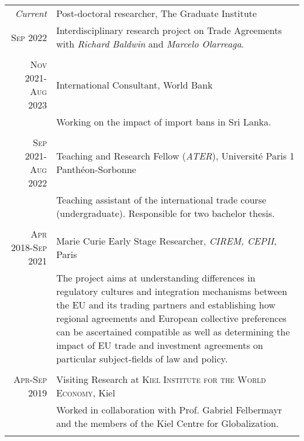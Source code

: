 \documentclass[a4paper,10pt]{article} %
\begin{document}
\begin{tabular}{r|p{11cm}}


\emph{Current} & Post-doctoral researcher, The Graduate Institute \\
\textsc{Sep 2022} & \footnotesize{Interdisciplinary research project on Trade Agreements with \textit{Richard Baldwin} and \textit{Marcelo Olarreaga}.}\\
\multicolumn{2}{c}{} \\


\textsc{Nov 2021-Aug 2023} & International Consultant, World Bank \\
 & \footnotesize{Working on the impact of import bans in Sri Lanka.}\\
\multicolumn{2}{c}{} \\


\textsc{Sep 2021-Aug 2022} & Teaching and Research Fellow (\textit{ATER}), Université Paris 1 Panthéon-Sorbonne \\
& \footnotesize{Teaching assistant of the international trade course (undergraduate). Responsible for two bachelor thesis.}\\
\multicolumn{2}{c}{} \\


\textsc{Apr 2018-Sep 2021} & Marie Curie Early Stage Researcher, \emph{CIREM, CEPII}, Paris \\
& \footnotesize{The project aims at understanding differences in regulatory cultures and integration mechanisms between the EU and its trading partners and establishing how regional agreements and European collective preferences can be ascertained compatible as well as determining the impact of EU trade and investment agreements on particular subject-fields of law and policy.}\\
\multicolumn{2}{c}{} \\


\textsc{Apr-Sep 2019} & Visiting Research at \textsc{Kiel Institute for the World Economy}, Kiel \emph{}\\
& \footnotesize{Worked in collaboration with Prof. Gabriel Felbermayr and the members of the Kiel Centre for Globalization.}\\
\multicolumn{2}{c}{} \\


\end{tabular}
\end{document}
